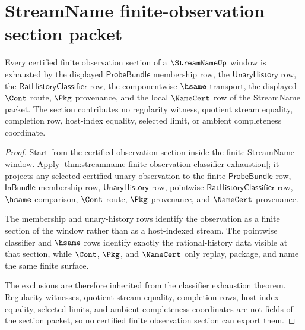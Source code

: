 \section{StreamName finite-observation section packet}
\label{sec:streamname-finite-observation-section-packet}

\begin{theorem}
\label{thm:streamname-finite-observation-section}
Every certified finite observation section of a $\StreamNameUp$ window is
exhausted by the displayed $\mathsf{ProbeBundle}$ membership row, the
$\mathsf{UnaryHistory}$ row, the $\mathsf{RatHistoryClassifier}$ row, the
componentwise $\hsame$ transport, the displayed $\Cont$ route, $\Pkg$
provenance, and the local $\NameCert$ row of the StreamName packet. The
section contributes no regularity witness, quotient stream equality,
completion row, host-index equality, selected limit, or ambient completeness
coordinate.
\end{theorem}
\begin{proof}
Start from the certified observation section inside the finite StreamName
window. Apply
\autoref{thm:streamname-finite-observation-classifier-exhaustion}; it
projects any selected certified unary observation to the finite
$\mathsf{ProbeBundle}$ row, $\mathsf{InBundle}$ membership row,
$\mathsf{UnaryHistory}$ row, pointwise $\mathsf{RatHistoryClassifier}$ row,
$\hsame$ comparison, $\Cont$ route, $\Pkg$ provenance, and $\NameCert$
provenance.

The membership and unary-history rows identify the observation as a finite
section of the window rather than as a host-indexed stream. The pointwise
classifier and $\hsame$ rows identify exactly the rational-history data
visible at that section, while $\Cont$, $\Pkg$, and $\NameCert$ only replay,
package, and name the same finite surface.

The exclusions are therefore inherited from the classifier exhaustion theorem.
Regularity witnesses, quotient stream equality, completion rows, host-index
equality, selected limits, and ambient completeness coordinates are not fields
of the section packet, so no certified finite observation section can export
them.
\end{proof}

